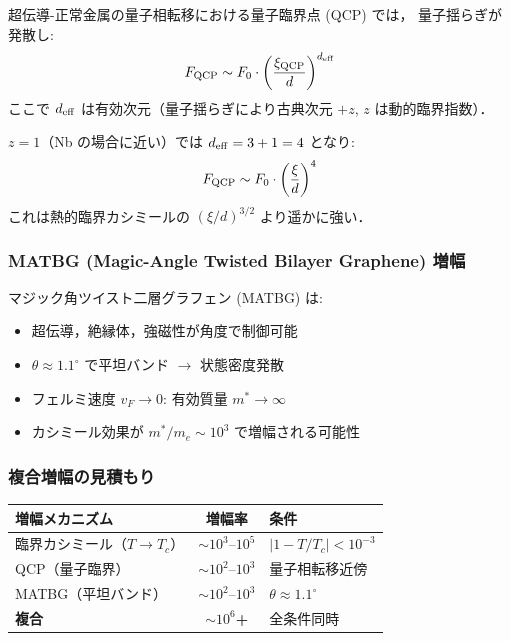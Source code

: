 超伝導-正常金属の量子相転移における量子臨界点 (QCP) では，
量子揺らぎが発散し:
\begin{equation}
F_{\rm QCP} \sim F_0 \cdot \left(\frac{\xi_{\rm QCP}}{d}\right)^{d_{\rm eff}}
\end{equation}
ここで $d_{\rm eff}$ は有効次元（量子揺らぎにより古典次元 $+z$,
$z$ は動的臨界指数）．

$z = 1$（Nb の場合に近い）では $d_{\rm eff} = 3 + 1 = 4$ となり:
\begin{equation}
F_{\rm QCP} \sim F_0 \cdot \left(\frac{\xi}{d}\right)^{4}
\end{equation}
これは熱的臨界カシミールの $(\xi/d)^{3/2}$ より遥かに強い．

\subsubsection{MATBG (Magic-Angle Twisted Bilayer Graphene) 増幅}

マジック角ツイスト二層グラフェン (MATBG) は:
\begin{itemize}
\item 超伝導，絶縁体，強磁性が角度で制御可能
\item $\theta \approx 1.1^\circ$ で平坦バンド $\to$ 状態密度発散
\item フェルミ速度 $v_F \to 0$: 有効質量 $m^* \to \infty$
\item カシミール効果が $m^*/m_e \sim 10^3$ で増幅される可能性
\end{itemize}

\subsubsection{複合増幅の見積もり}

\begin{center}
\begin{tabular}{lcl}
\toprule
増幅メカニズム & 増幅率 & 条件 \\
\midrule
臨界カシミール（$T \to T_c$） & $\sim 10^3$--$10^5$ & $|1-T/T_c| < 10^{-3}$ \\
QCP（量子臨界） & $\sim 10^2$--$10^3$ & 量子相転移近傍 \\
MATBG（平坦バンド） & $\sim 10^2$--$10^3$ & $\theta \approx 1.1^\circ$ \\
\midrule
\textbf{複合} & $\sim 10^6$\textbf{+} & 全条件同時 \\
\bottomrule
\end{tabular}
\end{center}

